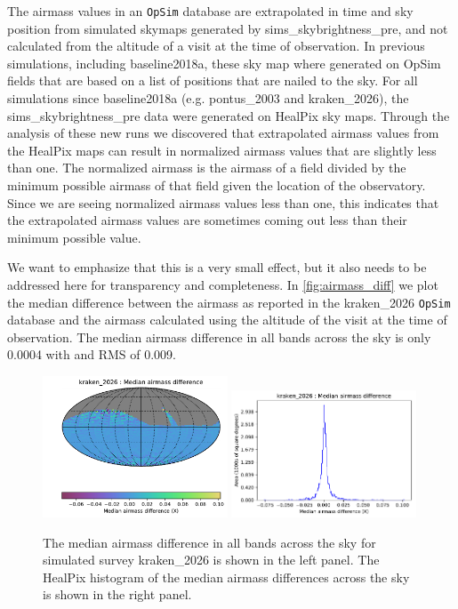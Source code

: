 \documentclass[DM,lsstdraft,authoryear,toc]{lsstdoc}
\newcommand{\opsim}{\texttt{OpSim}\xspace}
\begin{document}
The airmass values in an \opsim database are extrapolated in time and sky position from simulated skymaps generated
by sims\_skybrightness\_pre, and not calculated from the altitude of a visit at the time of observation.
In previous simulations, including baseline2018a, these sky map where generated on OpSim fields that are
based on a list of positions that are nailed to the sky. For all simulations since baseline2018a
(e.g. pontus\_2003 and kraken\_2026), the sims\_skybrightness\_pre data were generated on HealPix
sky maps. Through the analysis of these new runs we discovered that extrapolated airmass values
from the HealPix maps can result in normalized airmass values that are slightly less than one. The normalized
airmass is the airmass of a field divided by the minimum possible airmass of that field given the location
of the observatory. Since we are seeing normalized airmass values less than one, this indicates that the
extrapolated airmass values are sometimes coming out less than their minimum possible value.

We want to emphasize that this is a very small effect, but it also needs to be addressed here for transparency and
completeness.  In \autoref{fig:airmass_diff} we plot the median difference between the airmass as reported in the kraken\_2026
\opsim database and the airmass calculated using the altitude of the visit at the time of observation. The median airmass
difference in all bands across the sky is only 0.0004 with and RMS of 0.009.

\begin{figure}[ht]
\centering
\includegraphics[width=0.49\textwidth]{figures/kraken_2026_Median_airmass_difference_HEAL_SkyMap.pdf}
\includegraphics[width=0.49\textwidth]{figures/kraken_2026_Median_airmass_difference_HEAL_Histogram.pdf}
\caption{The median airmass difference  in all bands across the sky for simulated survey
kraken\_2026 is shown in the left panel. The HealPix histogram of the median airmass differences
across the sky is shown in the right panel.}
\label{fig:airmass_diff}
\end{figure}
\end{document}
